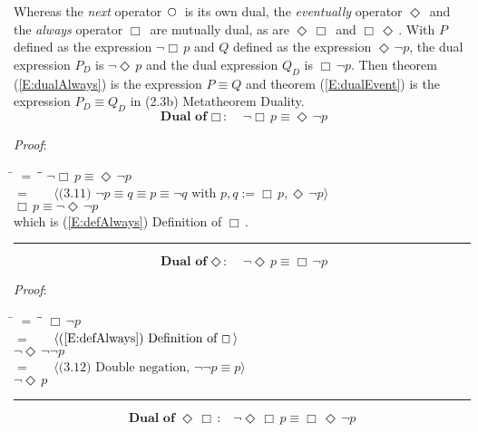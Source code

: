\documentclass[12pt, fleqn, leqno]{article}
\newcommand{\lgap}{2pt}                             %
\newcommand{\mymathindent}{24pt}                    %
\newcommand{\Next}{\;\,\text{\raisebox{3.5pt}{\circle{6}}}}
\newcommand{\Event}{\Diamond\,}
\newcommand{\Always}{\Box\,}
\newcommand{\myqed}{\rule[-.23ex]{1.2ex}{2.0ex}}
\newcommand{\myqedtab}{\hspace{384pt}}              %
\newcommand{\Gll} {\langle}                         %
\newcommand{\Ggg} {\rangle}                         %
\newcommand{\Hint}[1]     {\ \ \ $\Gll              \mbox{#1} \Ggg$ }   %
\begin{document}
Whereas the \textit{next} operator $\Next$ is its own dual, the \textit{eventually} operator $\Event$
and the \textit{always} operator $\Always$
are mutually dual, as are $\Event \Always$ and $\Always\Event$.
With $P$ defined as the expression $\neg\Always p$ and $Q$ defined as the expression $\Event\neg p$, the dual expression $P_D$ is $\neg\Event p$ and the dual expression $Q_D$ is $\Always\neg p$.
Then theorem (\ref{E:dualAlways}) is the expression $P\equiv Q$ and theorem (\ref{E:dualEvent}) is the expression $P_D\equiv Q_D$ in (2.3b) Metatheorem Duality.
\begin{equation}\label{E:dualAlways}
\textbf{Dual of $\Always$:}\quad \neg\Always p \equiv \Event\neg p
\end{equation}

\emph{Proof}:
\begin{tabbing}
\hspace{\mymathindent} \= $= \;$ \= \myqedtab \= \kill
  \> \>   $\neg\Always p \equiv \Event\neg p$\\[\lgap]
  \> $=$  \>  \Hint{(3.11) $\neg p \equiv q \equiv p \equiv \neg q$ with $p,q := \Always p, \Event\neg p$}\\[\lgap]
  \> \>   $\Always p \equiv \neg\Event\neg p$\\[\lgap]
  \> which is (\ref{E:defAlways}) Definition of $\Always$. \quad \myqed
\end{tabbing}
\begin{equation}\label{E:dualEvent}
\textbf{Dual of $\Event$:}\quad \neg\Event p \equiv \Always\neg p
\end{equation}

\emph{Proof}:
\begin{tabbing}
\hspace{\mymathindent} \= $= \;$ \= \myqedtab \= \kill
  \> \>   $\Always\neg p$\\[\lgap]
  \> $=$  \>  \Hint{(\ref{E:defAlways}) Definition of $\Always$}\\[\lgap]
  \> \>   $\neg\Event\neg\neg p$\\[\lgap]
  \> $=$  \>  \Hint{(3.12) Double negation, $\neg\neg p\equiv p$}\\[\lgap]
  \> \>   $\neg\Event p$ \quad \myqed
\end{tabbing}
\begin{equation}\label{E:dualEventAlways}
\textbf{Dual of $\Event \Always$:}\quad \neg \Event\Always p \equiv \Always\Event \neg p
\end{equation}
\end{document}
